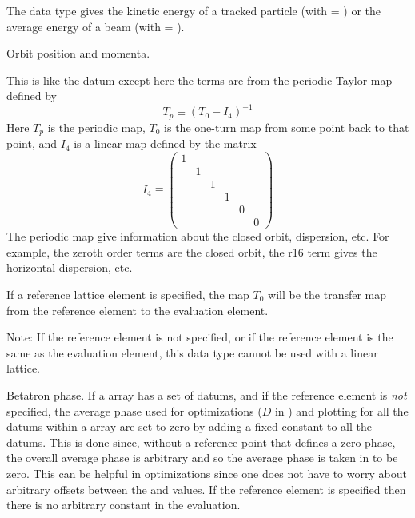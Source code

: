 \begin{description}
{  %
  \item[orbit.kinetic] \Newline {}
The  data type gives the kinetic energy of a tracked particle (with
 = ) or the average energy of a beam (with  =
).

  \item[orbit.x, .y, .z, .px, .py, .pz] \Newline {}
Orbit position and momenta.

  \item[periodic.tt.$ijklm\ldots$ \hspace{0.2in} $1 \le i,j,k,\ldots \le 6$] \Newline {}
This is like the  datum except here the terms are from the
periodic Taylor map defined by
\begin{equation}
  T_p \equiv (T_0 - I_4)^{-1}
\end{equation}
Here $T_p$ is the
periodic map, $T_0$ is the one-turn map from some point back to that
point, and $I_4$ is a linear map defined by the matrix
\begin{equation}
  I_4 \equiv 
    \begin{pmatrix}
      1 &   &   &   &   &   \\
        & 1 &   &   &   &   \\
        &   & 1 &   &   &   \\
        &   &   & 1 &   &   \\
        &   &   &   & 0 &   \\
        &   &   &   &   & 0
    \end{pmatrix}
\end{equation}
The periodic map give information about the closed orbit, dispersion,
etc. For example, the zeroth order terms are the closed orbit, the r16
term gives the horizontal dispersion, etc.

If a reference lattice element is specified, the map $T_0$ will be
the transfer map from the reference element to the evaluation element.

Note: If the reference element is not specified, or if the reference
element is the same as the evaluation element, this data type cannot
be used with a linear lattice.

  \item[phase.a, .b] \Newline {}
Betatron phase.  If a  array has a set of
 datums, and if the reference element is {\em not}
specified, the average phase used for optimizations ($D$ in
) and plotting for all the datums within a 
array are set to zero by adding a fixed constant to all the datums.
This is done since, without a reference point that defines a zero
phase, the overall average phase is arbitrary and so the average phase
is taken in \tao to be zero. This can be helpful in optimizations
since one does not have to worry about arbitrary offsets between the
 and  values. If the reference element is
specified then there is no arbitrary constant in the evaluation.

}
\end{description}
